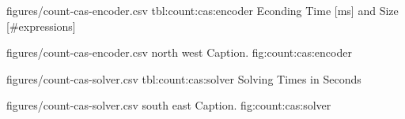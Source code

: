 
\EncoderStatsTable
  {figures/count-cas-encoder.csv}
  {tbl:count:cas:encoder}
  {Econding Time [ms] and Size [\#expressions]}

\EncoderStatsGraph
  {figures/count-cas-encoder.csv}
  {north west}
  {Caption.}
  {fig:count:cas:encoder}

\newpage
{}

\SolverStatsTable
  {figures/count-cas-solver.csv}
  {tbl:count:cas:solver}
  {Solving Times in Seconds}

\SolverStatsGraph
  {figures/count-cas-solver.csv}
  {south east}
  {Caption.}
  {fig:count:cas:solver}
